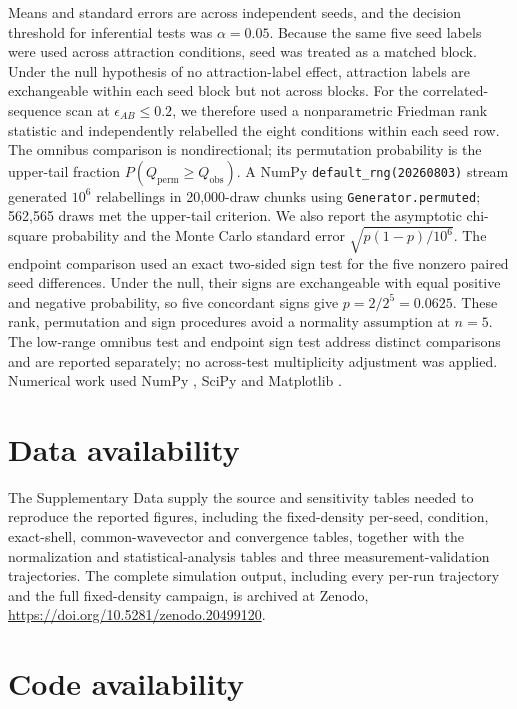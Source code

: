 \documentclass[pdflatex,sn-nature,onecolumn]{sn-jnl}
\begin{document}
Means and standard errors are across independent seeds, and the decision threshold for inferential tests was $\alpha=0.05$. Because the same five seed labels were used across attraction conditions, seed was treated as a matched block. Under the null hypothesis of no attraction-label effect, attraction labels are exchangeable within each seed block but not across blocks. For the correlated-sequence scan at $\epsilon_{AB}\le0.2$, we therefore used a nonparametric Friedman rank statistic and independently relabelled the eight conditions within each seed row. The omnibus comparison is nondirectional; its permutation probability is the upper-tail fraction $P(Q_{\mathrm{perm}}\ge Q_{\mathrm{obs}})$. A NumPy \texttt{default\_rng(20260803)} stream generated $10^6$ relabellings in 20,000-draw chunks using \texttt{Generator.permuted}; 562,565 draws met the upper-tail criterion. We also report the asymptotic chi-square probability and the Monte Carlo standard error $\sqrt{p(1-p)/10^6}$. The endpoint comparison used an exact two-sided sign test for the five nonzero paired seed differences. Under the null, their signs are exchangeable with equal positive and negative probability, so five concordant signs give $p=2/2^5=0.0625$. These rank, permutation and sign procedures avoid a normality assumption at $n=5$. The low-range omnibus test and endpoint sign test address distinct comparisons and are reported separately; no across-test multiplicity adjustment was applied. Numerical work used NumPy \cite{Harris2020}, SciPy \cite{Virtanen2020} and Matplotlib \cite{Hunter2007}.

\section{Data availability}

The Supplementary Data supply the source and sensitivity tables needed to reproduce the reported figures, including the fixed-density per-seed, condition, exact-shell, common-wavevector and convergence tables, together with the normalization and statistical-analysis tables and three measurement-validation trajectories. The complete simulation output, including every per-run trajectory and the full fixed-density campaign, is archived at Zenodo, \url{https://doi.org/10.5281/zenodo.20499120}.

\section{Code availability}
\end{document}
